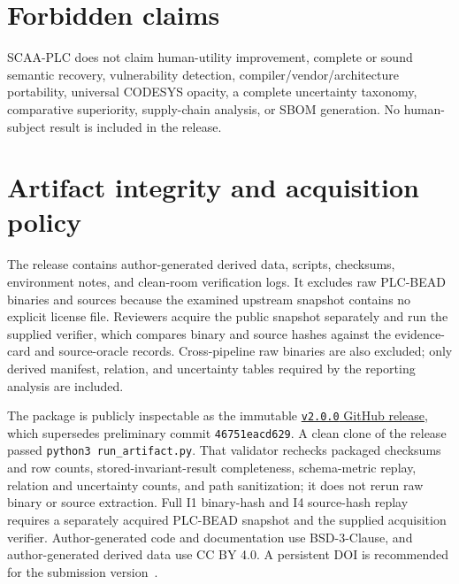 \documentclass[manuscript,screen,review]{acmart}
\begin{document}
\section{Forbidden claims}

SCAA-PLC does not claim human-utility improvement, complete or sound semantic recovery, vulnerability detection, compiler/vendor/architecture portability, universal CODESYS opacity, a complete uncertainty taxonomy, comparative superiority, supply-chain analysis, or SBOM generation. No human-subject result is included in the release.

\section{Artifact integrity and acquisition policy}

The release contains author-generated derived data, scripts, checksums, environment notes, and clean-room verification logs. It excludes raw PLC-BEAD binaries and sources because the examined upstream snapshot contains no explicit license file. Reviewers acquire the public snapshot separately and run the supplied verifier, which compares binary and source hashes against the evidence-card and source-oracle records. Cross-pipeline raw binaries are also excluded; only derived manifest, relation, and uncertainty tables required by the reporting analysis are included.

The package is publicly inspectable as the immutable \href{https://github.com/Mewtwoz/SCAA_PLC_ARTIFACT/releases/tag/v2.0.0}{\texttt{v2.0.0} GitHub release}, which supersedes preliminary commit \texttt{46751eacd629}. A clean clone of the release passed \texttt{python3 run\_artifact.py}. That validator rechecks packaged checksums and row counts, stored-invariant-result completeness, schema-metric replay, relation and uncertainty counts, and path sanitization; it does not rerun raw binary or source extraction. Full I1 binary-hash and I4 source-hash replay requires a separately acquired PLC-BEAD snapshot and the supplied acquisition verifier. Author-generated code and documentation use BSD-3-Clause, and author-generated derived data use CC BY 4.0. A persistent DOI is recommended for the submission version~\cite{heumueller_software_artifacts2020}.



\end{document}
